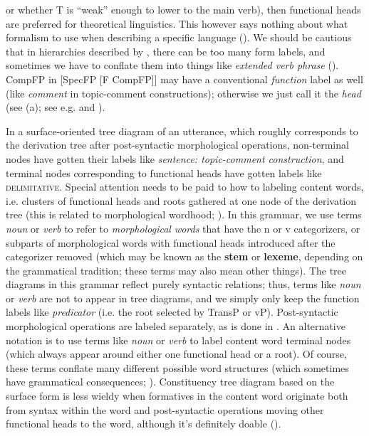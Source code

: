 \documentclass[UTF8, a4paper, oneside, scheme=plain, 12pt]{ctexrep}
\newcommand*{\citepages}[1]{pp.~{#1}}
\newcommand*{\concept}[1]{\textbf{#1}}
\newcommand*{\term}[1]{\emph{#1}}
\newcommand{\form}[1]{\emph{#1}}
\newcommand*{\category}[1]{\textsc{#1}}
\begin{document}
{\begin{itemize}
{        or whether T is ``weak'' enough to lower to the main verb),
        then functional heads are preferred for theoretical linguistics.
        This however says nothing about what formalism to use 
        when describing a specific language ().
    }
    We should be cautious that in hierarchies described by \citet{cinque1999adverbs},
    there can be too many form labels,
    and sometimes we have to conflate them into things like \form{extended verb phrase}
    ().
    CompFP in [SpecFP [F CompFP]] may have a conventional \emph{function} label as well
    (like \form{comment} in topic-comment constructions);
    otherwise we just call it the \term{head} (see (a); see e.g.  and ).

    In a surface-oriented tree diagram of an utterance,
    which roughly corresponds to the derivation tree after post-syntactic morphological operations,
    non-terminal nodes have gotten their labels like \term{sentence: topic-comment construction},
    and terminal nodes corresponding to functional heads have gotten labels like \category{delimitative}.
    Special attention needs to be paid to how to labeling content words,
    i.e. clusters of functional heads and roots gathered at one node of the derivation tree
    (this is related to morphological wordhood; ).
    In this grammar, we use terms \term{noun} or \term{verb}
    to refer to \emph{morphological words} that have the n or v categorizers,
    or subparts of morphological words  with functional heads introduced after the categorizer removed
    (which may be known as the \concept{stem} or \concept{lexeme},
    depending on the grammatical tradition;
    these terms may also mean other things).
    The tree diagrams in this grammar reflect purely syntactic relations;
    thus, terms like \term{noun} or \term{verb} are not to appear in tree diagrams,
    and we simply only keep the function labels like \term{predicator}
    (i.e. the root selected by TransP or vP).
    Post-syntactic morphological operations are labeled separately,
    as is done in .
    An alternative notation is to use terms like \term{noun} or \term{verb}
    to label content word terminal nodes (which always appear around either one functional head or a root).
    Of course, these terms conflate many different possible word structures
    (which sometimes have grammatical consequences; \citealt[\citepages{59-60}]{siddiqi2009syntax}).
    Constituency tree diagram based on the surface form is
    less wieldy when formatives in the content word
    originate both from syntax within the word and post-syntactic operations moving 
    other functional heads to the word,
    although it's definitely doable ().
\end{itemize}

}
\end{document}
